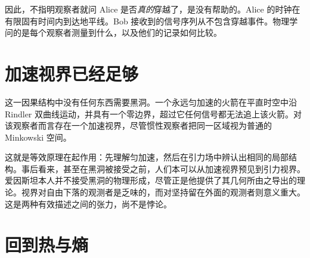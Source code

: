 \begin{classroomqa}
\end{classroomqa}

因此，不指明观察者就问 Alice 是否\emph{真的}穿越了，是没有帮助的。Alice 的时钟在有限固有时间内到达地平线。Bob 接收到的信号序列从不包含穿越事件。物理学问的是每个观察者测量到什么，以及他们的记录如何比较。

\begin{classroomqa}
\end{classroomqa}

\section{加速视界已经足够}

这一因果结构中没有任何东西需要黑洞。一个永远匀加速的火箭在平直时空中沿 Rindler 双曲线运动，并具有一个零边界，超过它任何信号都无法追上该火箭。对该观察者而言存在一个加速视界，尽管惯性观察者把同一区域视为普通的 Minkowski 空间。

\begin{classroomqa}
\end{classroomqa}

这就是等效原理在起作用：先理解匀加速，然后在引力场中辨认出相同的局部结构。事后看来，甚至在黑洞被接受之前，人们本可以从加速视界预见到引力视界。爱因斯坦本人并不接受黑洞的物理形成，尽管正是他提供了其几何所由之导出的理论。视界对自由下落的观测者是乏味的，而对坚持留在外面的观测者则意义重大。这是两种有效描述之间的张力，尚不是悖论。

\section{回到热与熵}

